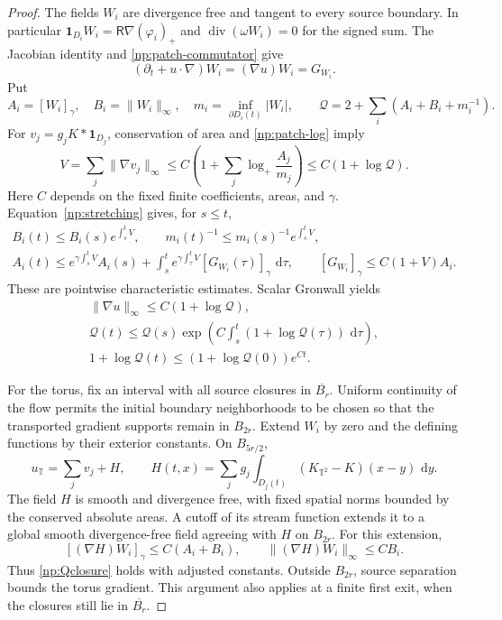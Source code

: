 \documentclass[11pt]{amsart}
\theoremstyle{remark}
\numberwithin{equation}{section}
\newcommand{\T}{\mathbb T}
\newcommand{\dd}{\,\mathrm d}
\begin{document}
\begin{proof}
The fields $W_i$ are divergence free and tangent to every source
boundary. In particular
$\mathbf1_{D_i}W_i=\mathsf R\nabla(\varphi_i)_+$ and
$\operatorname{div}(\omega W_i)=0$ for the signed sum.
The Jacobian identity and \eqref{np:patch-commutator} give
\begin{equation}\label{np:stretching}
 (\partial_t+u\cdot\nabla)W_i=(\nabla u)W_i=G_{W_i}.
\end{equation}
Put
\[
 A_i=[W_i]_\gamma,\quad B_i=\|W_i\|_\infty,\quad
 m_i=\inf_{\partial D_i(t)}|W_i|,\qquad
 \mathcal Q=2+\sum_i(A_i+B_i+m_i^{-1}).
\]
For $v_j=g_jK*\mathbf1_{D_j}$, conservation of area and
\eqref{np:patch-log} imply
\[
 V=\sum_j\|\nabla v_j\|_\infty
 \le C\left(1+\sum_j\log_+\frac{A_j}{m_j}\right)
 \le C(1+\log\mathcal Q).
\]
Here $C$ depends on the fixed finite coefficients, areas, and
$\gamma$. Equation~\eqref{np:stretching} gives, for $s\le t$,
\[
 \begin{gathered}
 B_i(t)\le B_i(s)e^{\int_s^tV},\qquad
 m_i(t)^{-1}\le m_i(s)^{-1}e^{\int_s^tV},\\
 A_i(t)\le e^{\gamma\int_s^tV}A_i(s)
       +\int_s^t e^{\gamma\int_\tau^tV}[G_{W_i}(\tau)]_\gamma\,\dd\tau,
 \qquad [G_{W_i}]_\gamma\le C(1+V)A_i.
 \end{gathered}
\]
These are pointwise characteristic estimates. Scalar Gronwall yields
\begin{equation}\label{np:Qclosure}
 \begin{gathered}
 \|\nabla u\|_\infty\le C(1+\log\mathcal Q),\\
 \mathcal Q(t)\le\mathcal Q(s)
       \exp\left(C\int_s^t(1+\log\mathcal Q(\tau))\,\dd\tau\right),\\
 1+\log\mathcal Q(t)\le(1+\log\mathcal Q(0))e^{Ct}.
 \end{gathered}
\end{equation}

For the torus, fix an interval with all source closures in
$\overline{B_r}$. Uniform continuity of the flow permits the
initial boundary neighborhoods to be chosen so that the transported
gradient supports remain in $B_{2r}$. Extend $W_i$ by zero and the
defining functions by their exterior constants. On $B_{5r/2}$,
\[
 u_{\T}=\sum_jv_j+H,\qquad
 H(t,x)=\sum_jg_j\int_{D_j(t)}(K_{\T^2}-K)(x-y)\,\dd y.
\]
The field $H$ is smooth and divergence free, with fixed spatial
norms bounded by the conserved absolute areas. A cutoff of its
stream function extends it to a global smooth divergence-free
field agreeing with $H$ on $B_{2r}$. For this extension,
\[
 [ (\nabla H)W_i]_\gamma\le C(A_i+B_i),\qquad
 \|(\nabla H)W_i\|_\infty\le CB_i.
\]
Thus \eqref{np:Qclosure} holds with adjusted constants. Outside
$B_{2r}$, source separation bounds the torus gradient. This
argument also applies at a finite first exit, when the closures
still lie in $\overline{B_r}$.


\end{proof}
\end{document}
